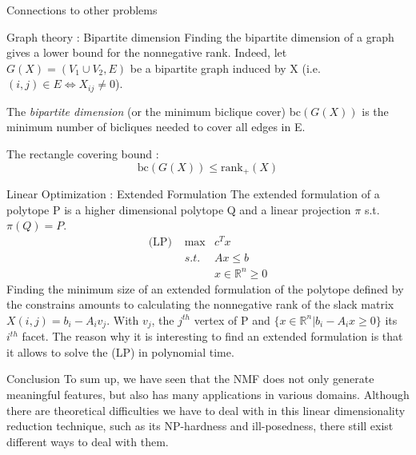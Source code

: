 \documentclass[final]{beamer}
\newlength{\onecolwid}
\begin{document}
\begin{frame}
\begin{columns}[t]
\begin{column}{\onecolwid}
\begin{exampleblock}{Connections to other problems}
\begin{block}{Graph theory : Bipartite dimension}
Finding the bipartite dimension of a graph gives a lower bound for the nonnegative rank. Indeed, let $G(X) = (V_1 \cup V_2, E)$ be a bipartite graph induced by X (i.e. $(i,j)\in E \Leftrightarrow X_{ij}\neq 0$). 
    
    The \textit{bipartite dimension} (or the minimum biclique cover) bc$(G(X))$ is the minimum number of bicliques needed to cover all edges in E.
    
    The rectangle covering bound : %
    \[\text{bc}(G(X))\leq \text{rank}_+(X)
\]
\end{block}

\begin{block}{Linear Optimization : Extended Formulation}
The extended formulation of a polytope P is a higher dimensional polytope Q and a linear projection $\pi$ s.t. $\pi(Q) = P$.
    \begin{align*}
    \text{(LP) } & \max & c^T x\\
     &s.t. & Ax\leq b\\
     & & x \in \mathbb{R}^n \geq 0
    \end{align*}
    Finding the minimum size of an extended formulation of the polytope defined by the constrains amounts to calculating the nonnegative rank of the slack matrix $X(i,j) = b_i-A_iv_j$. With $v_j$, the $j^{th}$ vertex of P and $\{x\in \mathbb{R}^n | b_i-A_ix\geq 0\}$ its $i^{th}$ facet.
    The reason why it is interesting to find an extended formulation is that it allows to solve the (LP) in polynomial time.
\end{block}

\end{exampleblock}

\begin{alertblock}{Conclusion}
To sum up, we have seen that the NMF does not only generate meaningful features, but also has many applications in various domains. Although there are theoretical difficulties we have to deal with in this linear dimensionality reduction technique, such as its NP-hardness and ill-posedness, there still exist different ways to deal with them.
\end{alertblock}


\end{column}
\end{columns}
\end{frame}
\end{document}
